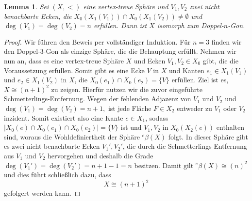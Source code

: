 \documentclass[12pt,titlepage,twoside,cleardoublepage]{article}
\theoremstyle{nummermitklammern}
\newtheorem{lemma}[temp]{Lemma}
\newtheorem{lemma}[zahl]{Lemma}
\numberwithin{equation}{section}
\begin{document}
\begin{lemma}\label{ngon}
Sei $(X,<)$ eine vertex-treue Sphäre und $V_1,V_2$ zwei nicht benachbarte Ecken, die  $X_0(X_1(V_1))\cap X_0(X_1(V_2))\neq \emptyset$ und $\deg(V_1)=\deg(V_2)= n$ erfüllen. Dann ist $X$ isomorph zum Doppel-$n$-Gon.
\end{lemma}
\begin{proof}
Wir  führen den Beweis per vollständiger Induktion. Für $n=3$ finden wir den Doppel-3-Gon als einzige Sphäre, die die Behauptung erfüllt. Nehmen wir nun an, dass es eine vertex-treue Sphäre $X$ und Ecken $V_1,V_2\in X_0$ gibt, die die Voraussetzung erfüllen. Somit gibt es eine Ecke $V$ in $X$ und Kanten $e_1\in X_1(V_1)$ und $e_2 \in X_1(V_2)$ in $X$, die $X_0(e_1)\cap X_0(e_2)=\{V\}$ erfüllen.
 Ziel ist es, $X\cong (n+1)^2$ zu zeigen. Hierfür nutzen wir die zuvor eingeführte Schmetterlings-Entfernung. Wegen der fehlenden Adjazenz von $V_1$ und $V_2$ und $\deg(V_1)=\deg(V_2)= n+1,$ ist jede Fläche $F\in X_2$ entweder zu $V_1$ oder $V_2$ inzident. Somit existiert also eine Kante $e\in X_1$, sodass $\vert X_0(e)\cap X_0(e_1)\cap X_0(e_2)\vert  =\{V\}$
 ist und $V_1,V_2$ in $X_0(X_2(e))$ enthalten sind, woraus die Wohldefiniertheit der Sphäre ${{}^e\beta(X)}$ folgt. In dieser Sphäre gibt es zwei nicht benachbarte Ecken $V_1',V_2'$, die durch die Schmetterlings-Entfernung aus $V_1$ und $V_2$ hervorgehen und deshalb die Grade $\deg(V_1')=\deg(V_2')=n+1-1=n$ besitzen. Damit gilt ${{}^e\beta(X)}\cong (n)^2$ und dies führt schließlich dazu, dass 
 \[
X\cong (n+1)^2 
 \]
 gefolgert werden kann.
\end{proof}
\end{document}
